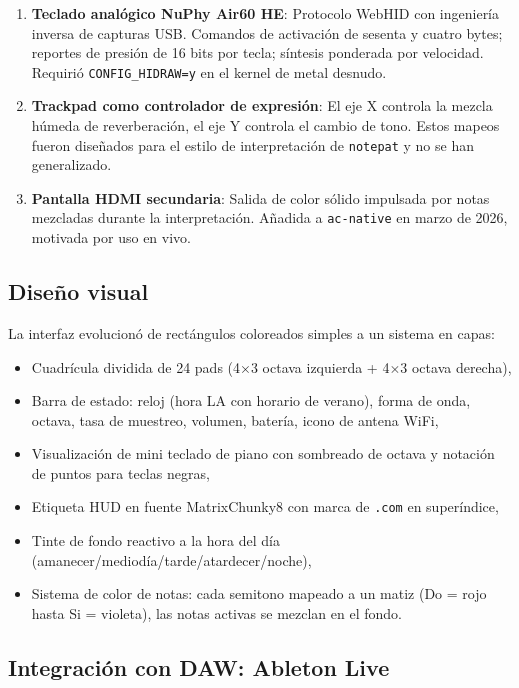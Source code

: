 \documentclass[10pt,letterpaper,twocolumn]{article}
\begin{document}
\begin{enumerate}
  \item \textbf{Teclado analógico NuPhy Air60 HE}: Protocolo WebHID con ingeniería inversa de capturas USB. Comandos de activación de sesenta y cuatro bytes; reportes de presión de 16 bits por tecla; síntesis ponderada por velocidad. Requirió \texttt{CONFIG\_HIDRAW=y} en el kernel de metal desnudo.
  \item \textbf{Trackpad como controlador de expresión}: El eje X controla la mezcla húmeda de reverberación, el eje Y controla el cambio de tono. Estos mapeos fueron diseñados para el estilo de interpretación de \texttt{notepat} y no se han generalizado.
  \item \textbf{Pantalla HDMI secundaria}: Salida de color sólido impulsada por notas mezcladas durante la interpretación. Añadida a \texttt{ac-native} en marzo de 2026, motivada por uso en vivo.
\end{enumerate}

\subsection{Diseño visual}

La interfaz evolucionó de rectángulos coloreados simples a un sistema en capas:

\begin{itemize}
  \item Cuadrícula dividida de 24 pads (4$\times$3 octava izquierda + 4$\times$3 octava derecha),
  \item Barra de estado: reloj (hora LA con horario de verano), forma de onda, octava, tasa de muestreo, volumen, batería, icono de antena WiFi,
  \item Visualización de mini teclado de piano con sombreado de octava y notación de puntos para teclas negras,
  \item Etiqueta HUD en fuente MatrixChunky8 con marca de \texttt{.com} en superíndice,
  \item Tinte de fondo reactivo a la hora del día (amanecer/mediodía/tarde/atardecer/noche),
  \item Sistema de color de notas: cada semitono mapeado a un matiz (Do = rojo hasta Si = violeta), las notas activas se mezclan en el fondo.
\end{itemize}

\subsection{Integración con DAW: Ableton Live}
\end{document}
